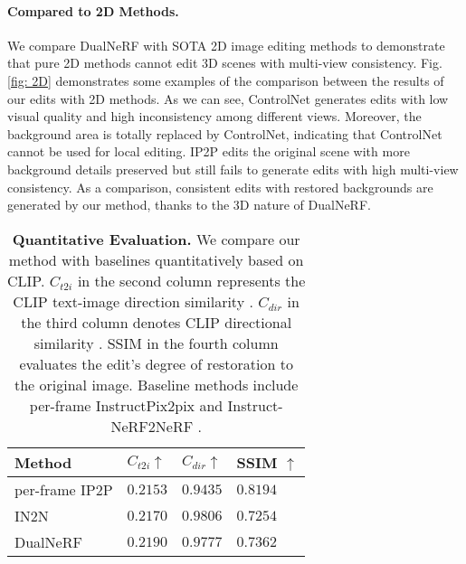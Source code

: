 \paragraph{Compared to 2D Methods.}
We compare DualNeRF with SOTA 2D image editing methods to demonstrate that pure 2D methods cannot edit 3D scenes with multi-view consistency. Fig. \ref{fig: 2D} demonstrates some examples of the comparison between the results of our edits with 2D methods. As we can see, ControlNet generates edits with low visual quality and high inconsistency among different views. Moreover, the background area is totally replaced by ControlNet, indicating that ControlNet cannot be used for local editing. IP2P edits the original scene with more background details preserved but still fails to generate edits with high multi-view consistency. As a comparison, consistent edits with restored backgrounds are generated by our method, thanks to the 3D nature of DualNeRF.

\begin{table}[t]
    \centering
    \begin{tabular}{p{70pt}<{\centering}|p{40pt}<{\centering}|p{40pt}<{\centering}|p{40pt}<{\centering}}
    \toprule
    Method & $C_{t2i} \uparrow$ & $C_{dir} \uparrow$ & SSIM $\uparrow$ \\
    \midrule
    per-frame IP2P & $0.2153$ & $0.9435$ & $\boldsymbol{0.8194}$ \\
    IN2N & $0.2170$ & $\boldsymbol{0.9806}$ & $0.7254$ \\
    DualNeRF & $\boldsymbol{0.2190}$ & $0.9777$ & $0.7362$ \\
    \bottomrule
    \end{tabular}
    \caption{\textbf{Quantitative Evaluation.} We compare our method with baselines quantitatively based on CLIP. $C_{t2i}$ in the second column represents the CLIP text-image direction similarity \cite{haque2023instruct}. $C_{dir}$ in the third column denotes CLIP directional similarity \cite{haque2023instruct}. SSIM in the fourth column evaluates the edit's degree of restoration to the original image. Baseline methods include per-frame InstructPix2pix \cite{brooks2023instructpix2pix} and Instruct-NeRF2NeRF \cite{haque2023instruct}.}
    \label{tab: quantitative results}
\end{table}

